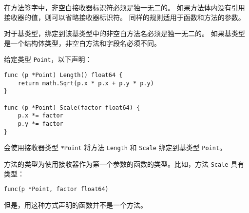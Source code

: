 在方法签字中，非空白接收器标识符必须是独一无二的。
如果方法体内没有引用接收器的值，则可以省略接收器标识符。
同样的规则适用于函数和方法的参数。

对于基类型，绑定到该基类型中的非空白方法名必须是独一无二的。
如果基类型是一个结构体类型，非空白方法和字段名必须不同。

给定类型 \lstinline|Point|，以下声明：
\begin{lstlisting}[style=golang]
func (p *Point) Length() float64 {
	return math.Sqrt(p.x * p.x + p.y * p.y)
}

func (p *Point) Scale(factor float64) {
	p.x *= factor
	p.y *= factor
}
\end{lstlisting}
会使用接收器类型 \lstinline|*Point| 将方法 \lstinline|Length| 和 \lstinline|Scale| 绑定到基类型 \lstinline|Point|。

方法的类型为使用接收器作为第一个参数的函数的类型。比如，方法 \lstinline|Scale| 具有类型：
\begin{lstlisting}[style=golang]
func(p *Point, factor float64)
\end{lstlisting}
但是，用这种方式声明的函数并不是一个方法。



















